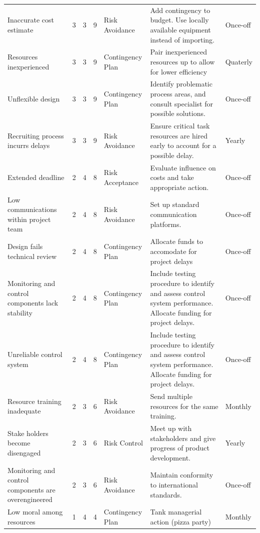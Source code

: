 \begin{appendices}
\begin{landscape}
\begin{table}[H]
{\begin{tabular}{lllllll}
Inaccurate cost estimate & 3 & 3 & \cellcolor[HTML]{F8FF00}9 & Risk Avoidance & Add contingency to budget. Use locally available equipment instead of importing. & Once-off \\
Resources inexperienced & 3 & 3 & \cellcolor[HTML]{F8FF00}9 & Contingency Plan & Pair inexperienced resources up to allow for lower efficiency & Quaterly \\
Unflexible design & 3 & 3 & \cellcolor[HTML]{F8FF00}9 & Contingency Plan & Identify problematic process areas, and consult specialist for possible solutions. & Once-off \\
Recruiting process incurrs delays & 3 & 3 & \cellcolor[HTML]{F8FF00}9 & Risk Avoidance & Ensure critical task resources are hired early to account for a possible delay. & Yearly \\
Extended deadline & 2 & 4 & \cellcolor[HTML]{F8FF00}8 & Risk Acceptance & Evaluate influence on costs and take appropriate action. & Once-off \\
Low communications within project team & 2 & 4 & \cellcolor[HTML]{F8FF00}8 & Risk Avoidance & Set up standard communication platforms. & Once-off \\
Design fails technical review & 2 & 4 & \cellcolor[HTML]{F8FF00}8 & Contingency Plan & Allocate funds to accomodate for project delays & Once-off \\
Monitoring and control components lack stability & 2 & 4 & \cellcolor[HTML]{F8FF00}8 & Contingency Plan & Include testing procedure to identify and assess control system performance. Allocate funding for project delays. & Once-off \\
Unreliable control system & 2 & 4 & \cellcolor[HTML]{F8FF00}8 & Contingency Plan & Include testing procedure to identify and assess control system performance. Allocate funding for project delays. & Once-off \\
Resource training inadequate & 2 & 3 & \cellcolor[HTML]{F8FF00}6 & Risk Avoidance & Send multiple resources for the same training. & Monthly \\
Stake holders become disengaged & 2 & 3 & \cellcolor[HTML]{F8FF00}6 & Risk Control & Meet up with stakeholders and give progress of product development. & Yearly \\
Monitoring and control components are overengineered & 2 & 3 & \cellcolor[HTML]{F8FF00}6 & Risk Avoidance & Maintain conformity to international standards. & Once-off \\
Low moral among resources & 1 & 4 & \cellcolor[HTML]{34FF34}4 & Contingency Plan & Tank managerial action (pizza party) & Monthly \\

\end{tabular}}
\end{table}
\end{landscape}
\end{appendices}
